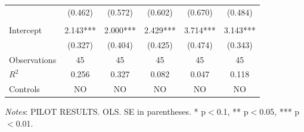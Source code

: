 \documentclass[11pt]{article}
\begin{document}
\begin{table}[!htbp]
\begin{threeparttable}
\begin{tabular}{l|ccccc}
 & (0.462) & (0.572) & (0.602) & (0.670) & (0.484) \\
\\[0.5em]
Intercept & 2.143*** & 2.000*** & 2.429*** & 3.714*** & 3.143*** \\
 & (0.327) & (0.404) & (0.425) & (0.474) & (0.343) \\
\midrule
Observations & 45 & 45 & 45 & 45 & 45 \\
$R^2$ & 0.256 & 0.327 & 0.082 & 0.047 & 0.118 \\
Controls & NO & NO & NO & NO & NO \\
\bottomrule
\end{tabular}
\begin{tablenotes}[flushleft]
\footnotesize
\item \textit{Notes}: PILOT RESULTS. OLS. SE in parentheses. * p$<$0.1, ** p$<$0.05, *** p$<$0.01.
\end{tablenotes}
\end{threeparttable}
\end{table}
\end{document}
